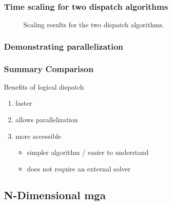 
\begin{frame}
    \frametitle{Time scaling for two dispatch algorithms}

    \begin{figure}
        \centering
        \resizebox{0.75\columnwidth}{!}{}
        \caption{Scaling results for the two dispatch algorithms.
        }
        \label{fig:time-scaling}
    \end{figure}
    
\end{frame}


\begin{frame}
    \frametitle{Demonstrating parallelization}

    \begin{figure}
        \centering
        \resizebox{0.75\columnwidth}{!}{}
        \caption{}
        \label{fig:parallel}
    \end{figure}
\end{frame}

\begin{frame}
    \frametitle{Summary Comparison}

    Benefits of logical dispatch

    \begin{enumerate}
        \item faster
        \item allows parallelization
        \item more accessible
        \begin{itemize}
            \item simpler algorithm / easier to understand
            \item does not require an external solver
        \end{itemize}
    \end{enumerate}

\end{frame}


\subsection{N-Dimensional \gls{mga}}

